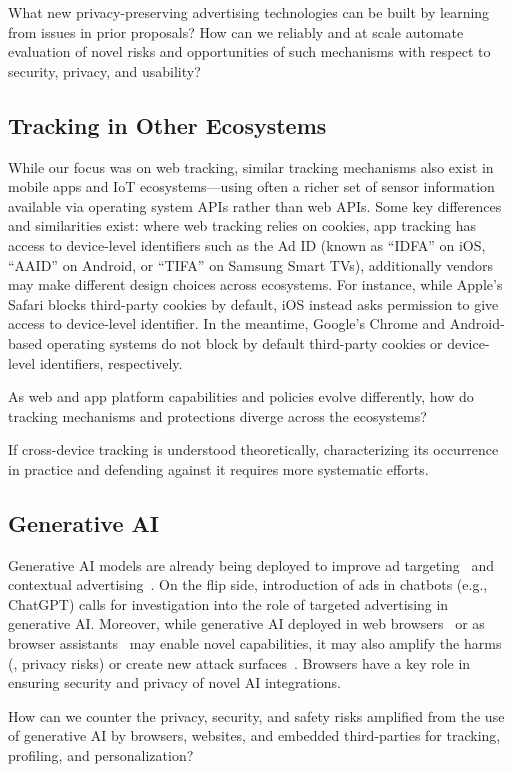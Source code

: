 \begin{opbox}
What new privacy-preserving advertising technologies can be built by learning from issues in prior proposals? How can we reliably and at scale automate evaluation of novel risks and opportunities of such mechanisms with respect to security, privacy, and usability?
\end{opbox}




\subsection{Tracking in Other Ecosystems}

While our focus was on web tracking, similar tracking mechanisms also exist in mobile apps and IoT ecosystems---using often a richer set of sensor information available via operating system APIs rather than web APIs. Some key differences and similarities exist: where web tracking relies on cookies, app tracking has access to device-level identifiers such as the Ad ID (known as ``IDFA'' on iOS, ``AAID'' on Android, or ``TIFA'' on Samsung Smart TVs), additionally vendors may make different design choices across ecosystems. For instance, while Apple's Safari blocks third-party cookies by default, iOS instead asks permission  to give access to device-level identifier. In the meantime, Google's Chrome and Android-based operating systems do not block by default third-party cookies or device-level identifiers, respectively.  


\begin{opbox}
As web and app platform capabilities and policies evolve differently, how do tracking mechanisms and protections diverge across the ecosystems? 
\end{opbox}


\begin{opbox}
If cross-device tracking is understood theoretically, characterizing its occurrence in practice and defending against it requires more systematic efforts.
\end{opbox}

\subsection{Generative AI}
Generative AI models are already being deployed to improve ad targeting~\cite{adv-week-genai-targeting} and contextual advertising~\cite{cognitiv2024cookieless}. 
%
On the flip side, introduction of ads in chatbots (e.g., ChatGPT) calls for investigation into the role of targeted advertising in generative AI.
%
Moreover, while generative AI deployed in web browsers~\cite{google2024chromeai} or as browser assistants~\cite{vekaria2025big} may enable novel capabilities, it may also amplify the harms (\eg{}, privacy risks) or create new attack surfaces~\cite{mcp-security}. 
%
Browsers have a key role in ensuring security and privacy of novel AI integrations.

\begin{opbox}
How can we counter the privacy, security, and safety risks amplified from the use of generative AI by browsers, websites, and embedded third-parties for tracking, profiling, and personalization?
\end{opbox}